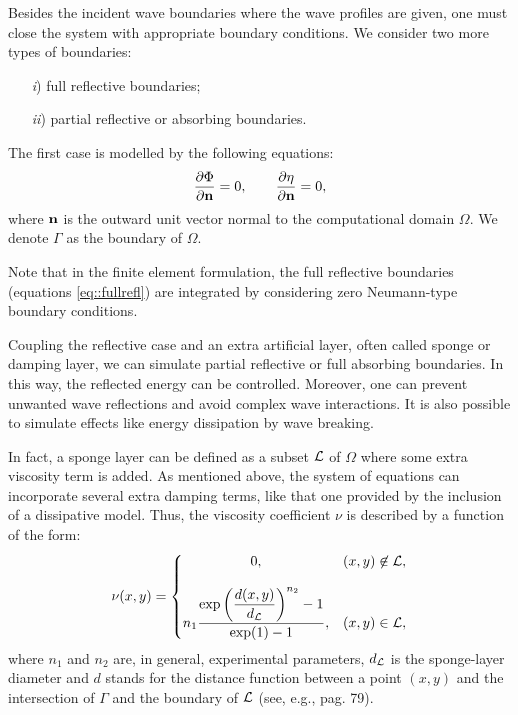 Besides the incident wave boundaries 
 where the wave profiles
are given, one must close the system with appropriate
boundary conditions. 
We consider two more types of
boundaries:
\begin{itemize}
\item[{\it i})] full reflective boundaries;
\item[{\it  ii})] partial reflective or absorbing boundaries. 
\end{itemize}
The first case is modelled by the following equations:
\begin{equation}\label{eq::fullrefl}
\frac{\partial \Phi}{\partial {\bf n}}=0,\qquad\frac{\partial \eta}{\partial {\bf n}}=0,
\end{equation}
where \({\bf n}\) is the outward unit vector normal to the
computational domain \(\Omega\).
We  denote  \(\Gamma\) as  the boundary of \(\Omega\). 

Note that  in  the finite element formulation, the full
reflective boundaries (equations \eqref{eq::fullrefl})  are integrated by
considering zero Neumann-type boundary conditions.

Coupling the  reflective case and an extra artificial  
  layer, often called sponge  or damping layer,
we can simulate partial reflective or full absorbing boundaries. 
In this way, the  reflected energy
can be controlled. Moreover, one can prevent unwanted wave
  reflections and avoid complex wave interactions. 
It is also possible to simulate effects like energy dissipation by wave breaking.
  
In fact, a sponge layer can be defined as a
subset \(\cal{L}\) of \(\Omega\) where 
some extra viscosity term is added. 
As mentioned above, the system of equations can incorporate
several extra damping terms, like that one provided by the
inclusion of  a dissipative model. Thus, the viscosity
coefficient \(\nu\) is described by a
 function of the form:
\begin{equation}
\nu(x,y)=
\left\{
\begin{matrix}
0,& (x,y)\not\in\cal{L} ,\\ \\
\displaystyle
n_1\frac{\displaystyle\exp{\left(\frac{d(x,y)}{d_{\cal{L}}}\right)^{n_2}}-1}{\exp(1)-1},&
(x,y) \in\cal{L},
\end{matrix}
\right.
\end{equation}  
where \(n_1\) and  \(n_2\) are, in general, experimental
 parameters, \(d_{\cal{L}}\) is  the sponge-layer diameter and
 \(d\)
stands for the distance function between a point \((x,y)\) and
 the intersection of \(\Gamma\) and the boundary
 of \(\cal{L}\) (see, e.g., \cite{Wal99} pag. 79). 

